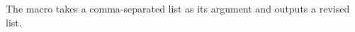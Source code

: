 \begin{lcode}
\providecommand{\z@}{0}
\providecommand{\@ne}{1}
\providecommand{\tw@}{2}

\newcount\totalcnt %
\newcount\entrycnt %
\newcommand*{\opname}[1]{#1}
\newcommand*{\pairsep}{\space and} 
\newcommand*{\midsep}{\unskip,}
\newcommand*{\lastsep}{\unskip, and}
\newcommand*{\commaed}[1]{%
  \totalcnt\z@%
  \@for\@tempa:=#1\do{\advance\totalcnt\@ne}%
  \entrycnt\@ne%
  \@for\@tempa:=#1\do{%
    \advance\entrycnt\@ne%
    \ifnum\totalcnt=\@ne
      \opname{\@tempa}
    \else
      \ifnum\totalcnt=\tw@
        \ifnum\entrycnt=\tw@
          \opname{\@tempa}\pairsep
        \else
          \opname{\@tempa}
        \fi
      \else 
       \ifnum\entrycnt<\totalcnt
         \opname{\@tempa}\midsep
       \else 
         \ifnum\entrycnt=\totalcnt
           \opname{\@tempa}\lastsep
         \else
           \opname{\@tempa}
         \fi
       \fi
     \fi
  \fi
  }%
}%
\end{lcode}    

The macro \cmd{\commaed} takes a comma-separated list as its argument and 
outputs a revised list.
\newcount\totalcnt %
\newcount\entrycnt %
\newcommand*{\opname}[1]{#1}
\newcommand*{\pairsep}{\space and} 
\newcommand*{\midsep}{\unskip,}
\newcommand*{\lastsep}{\unskip, and}
\makeatletter
\newcommand*{\commaed}[1]{%
  \totalcnt\z@%
  \@for\@tempa:=#1\do{\advance\totalcnt\@ne}%
  \entrycnt\@ne%
  \@for\@tempa:=#1\do{%
    \advance\entrycnt\@ne%
    \ifnum\totalcnt=\@ne
      \opname{\@tempa}
    \else
      \ifnum\totalcnt=\tw@
        \ifnum\entrycnt=\tw@
          \opname{\@tempa}\pairsep
        \else
          \opname{\@tempa}
        \fi
      \else 
       \ifnum\entrycnt<\totalcnt
         \opname{\@tempa}\midsep
       \else 
         \ifnum\entrycnt=\totalcnt
           \opname{\@tempa}\lastsep
         \else
           \opname{\@tempa}
         \fi
       \fi
     \fi
  \fi
  }%
}%
\makeatother


